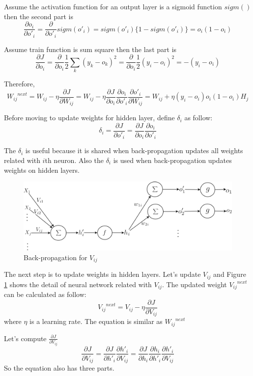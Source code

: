 \documentclass[draft,dvipsnames]{drexel-thesis}
\begin{document}
\begin{thesis}
Assume the activation function for an output layer is a sigmoid function $sigm()$ then the second part is
$$
\frac{\partial o_i}{\partial o'_i}
= \frac{\partial}{\partial o'_i}sigm(o'_i)
= sigm(o'_i)\{1-sigm(o'_i)\}
= o_i(1-o_i)
$$

Assume train function is sum square then the last part is
$$
\frac{\partial J}{\partial o_i}
= \frac{\partial}{\partial o_i}\frac{1}{2}\sum_k(y_k-o_k)^2
= \frac{\partial}{\partial o_i}\frac{1}{2}(y_i-o_i)^2
= -(y_i-o_i)
$$

Therefore,
$$
{{W_{ij}}^{next}}
= W_{ij} - \eta\frac{\partial J}{\partial W_{ij}}
= W_{ij} - \eta\frac{\partial J}{\partial o_i}\frac{\partial o_i}{\partial o'_i}\frac{\partial o'_i}{\partial W_{ij}}
= W_{ij} + \eta(y_i-o_i)o_i(1-o_i)H_j
$$

Before moving to update weights for hidden layer, define $\delta_i$ as follow:
$$
\delta_i
= \frac{\partial J}{\partial o'_i}
= \frac{\partial J}{\partial o_i}\frac{\partial o_i}{\partial o'_i}
$$

The $\delta_i$ is useful because it is shared when back-propagation updates all weights related with $i$th neuron. Also the $\delta_i$ is used when back-propagation updates weights on hidden layers.

\begin{figure}[t!]
    \centering
    \includegraphics[width=\textwidth]{pictures/figures/BP2.png}
    \caption{Back-propagation for $V_{ij}$}
    \label{fig:BP2}
\end{figure}

The next step is to update weights in hidden layers. Let's update $V_{ij}$ and Figure \ref{fig:BP2} shows the detail of neural network related with $V_{ij}$. The updated weight ${{V_{ij}}^{next}}$ can be calculated as follow:
$${{V_{ij}}^{next}}=V_{ij} - \eta\frac{\partial J}{\partial V_{ij}}$$ where $\eta$ is a learning rate. The equation is similar as ${{W_{ij}}^{next}}$

Let's compute $\frac{\partial J}{\partial V_{ij}}$
$$
\frac{\partial J}{\partial V_{ij}}
= \frac{\partial J}{\partial h'_i}\frac{\partial h'_i}{\partial V_{ij}}
= \frac{\partial J}{\partial h_i}\frac{\partial h_i}{\partial h'_i}\frac{\partial h'_i}{\partial V_{ij}}
$$
So the equation also has three parts.


\end{thesis}
\end{document}
